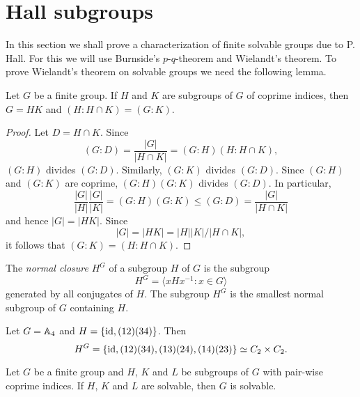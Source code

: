 \section*{Hall subgroups}

In this section we shall prove a characterization of finite solvable groups due to P. Hall. For this we will use Burnside's $p$-$q$-theorem and Wielandt's theorem.
To prove Wielandt's theorem on solvable groups 
we need the following lemma.  

\begin{lemma}
	\label{lemma:4Wielandt}
	Let $G$ be a finite group. If $H$ and $K$ are subgroups of $G$ of coprime indices, then 
    $G=HK$ and $(H:H\cap K)=(G:K)$.
\end{lemma}

\begin{proof}
	Let $D=H\cap K$. Since
	\[
	(G:D)=\frac{|G|}{|H\cap K|}=(G:H)(H:H\cap K),
	\]
	$(G:H)$ divides $(G:D)$. Similarly, $(G:K)$ divides 
	$(G:D)$. Since $(G:H)$ and $(G:K)$ are coprime, $(G:H)(G:K)$
	divides $(G:D)$. In particular, 
	\[
	\frac{|G|}{|H|}\frac{|G|}{|K|}=(G:H)(G:K)\leq (G:D)=\frac{|G|}{|H\cap K|}
	\]
	and hence $|G|=|HK|$. Since 
	\[
	|G|=|HK|=|H||K|/|H\cap K|, 
	\]
	it follows that 
	$(G:K)=(H:H\cap K)$.
\end{proof}

The 
{\em normal closure} $H^G$ of a subgroup $H$ of $G$ is the subgroup
\[
	H^G=\langle xHx^{-1}:x\in G\rangle
\]
generated by all conjugates of $H$. The 
subgroup $H^G$ is the smallest normal subgroup of $G$ containing $H$. 

\begin{example}
	Let $G=\mathbb{A}_4$ and $H=\{\operatorname{id},(12)(34)\}$. Then 
	\[
	H^G=\{\operatorname{id},(12)(34),(13)(24),(14)(23)\}\simeq C_2\times C_2.
	\]
\end{example}


\begin{theorem}[Wielandt]
	\label{theorem:Wielandt:solvable}
	Let $G$ be a finite group and $H$, $K$ and $L$ be subgroups of $G$ 
	with pair-wise coprime indices. If $H$, $K$ and $L$ are solvable, 
	then $G$ is solvable. 
\end{theorem}

